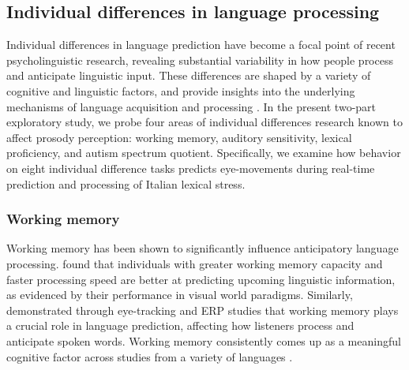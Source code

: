 \subsection{Individual differences in language processing}

Individual differences in language prediction have become a focal point of recent psycholinguistic research, revealing substantial variability in how people process and anticipate linguistic input. These differences are shaped by a variety of cognitive and linguistic factors, and provide insights into the underlying mechanisms of language acquisition and processing \citep{Huettig2016,Li2023,Kidd2018}. In the present two-part exploratory study, we probe four areas of individual differences research known to affect prosody perception: working memory, auditory sensitivity, lexical proficiency, and autism spectrum quotient. Specifically, we examine how behavior on eight individual difference tasks predicts eye-movements during real-time prediction and processing of Italian lexical stress.

\subsubsection{Working memory}
Working memory has been shown to significantly influence anticipatory language processing. \cite{Huettig2016} found that individuals with greater working memory capacity and faster processing speed are better at predicting upcoming linguistic information, as evidenced by their performance in visual world paradigms. Similarly, \cite{Li2023} demonstrated through eye-tracking and ERP studies that working memory plays a crucial role in language prediction, affecting how listeners process and anticipate spoken words. Working memory consistently comes up as a meaningful cognitive factor across studies from a variety of languages \citep{mchaney_et_al_2021_workingmemory,goss_2014,hadar_2016}. 


